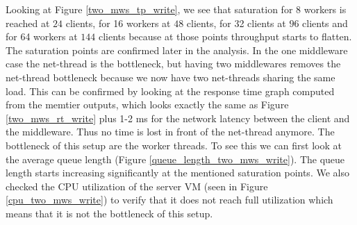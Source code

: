 Looking at Figure \ref{two_mws_tp_write}, we see that saturation for 8 workers is reached at $24$ clients, for 16 workers at $48$ clients, for 32 clients at $96$ clients and for 64 workers at $144$ clients because at those points throughput starts to flatten. The saturation points are confirmed later in the analysis. In the one middleware case the net-thread is the bottleneck, but having two middlewares removes the net-thread bottleneck because we now have two net-threads sharing the same load. This can be confirmed by looking at the response time graph computed from the memtier outputs, which looks exactly the same as Figure \ref{two_mws_rt_write} plus 1-2 ms for the network latency between the client and the middleware. Thus no time is lost in front of the net-thread anymore. 
The bottleneck of this setup are the worker threads. To see this we can first look at the average queue length (Figure \ref{queue_length_two_mws_write}). The queue length starts increasing significantly at the mentioned saturation points.
We also checked the CPU utilization of the server VM (seen in Figure \ref{cpu_two_mws_write}) to verify that it does not reach full utilization which means that it is not the bottleneck of this setup.


